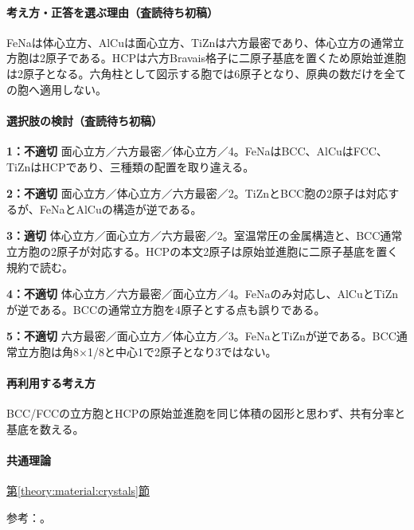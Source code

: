 \paragraph{考え方・正答を選ぶ理由（査読待ち初稿）} FeNaは体心立方、AlCuは面心立方、TiZnは六方最密であり、体心立方の通常立方胞は2原子である。HCPは六方Bravais格子に二原子基底を置くため原始並進胞は2原子となる。六角柱として図示する胞では6原子となり、原典の数だけを全ての胞へ適用しない。

\paragraph{選択肢の検討（査読待ち初稿）}\mbox{}\par

\noindent\textbf{1：不適切} 面心立方／六方最密／体心立方／4。FeNaはBCC、AlCuはFCC、TiZnはHCPであり、三種類の配置を取り違える。\par

\noindent\textbf{2：不適切} 面心立方／体心立方／六方最密／2。TiZnとBCC胞の2原子は対応するが、FeNaとAlCuの構造が逆である。\par

\noindent\textbf{3：適切} 体心立方／面心立方／六方最密／2。室温常圧の金属構造と、BCC通常立方胞の2原子が対応する。HCPの本文2原子は原始並進胞に二原子基底を置く規約で読む。\par

\noindent\textbf{4：不適切} 体心立方／六方最密／面心立方／4。FeNaのみ対応し、AlCuとTiZnが逆である。BCCの通常立方胞を4原子とする点も誤りである。\par

\noindent\textbf{5：不適切} 六方最密／面心立方／体心立方／3。FeNaとTiZnが逆である。BCC通常立方胞は角8×1/8と中心1で2原子となり3ではない。\par

\paragraph{再利用する考え方} BCC/FCCの立方胞とHCPの原始並進胞を同じ体積の図形と思わず、共有分率と基底を数える。

\paragraph{共通理論} \hyperref[theory:material:crystals]{第\ref*{theory:material:crystals}節}

\par 参考：\cite{cambridge_unitcell,princeton_hcp,princeton_iron,princeton_aluminum,princeton_copper,princeton_sodium,princeton_titanium,princeton_zinc}。

